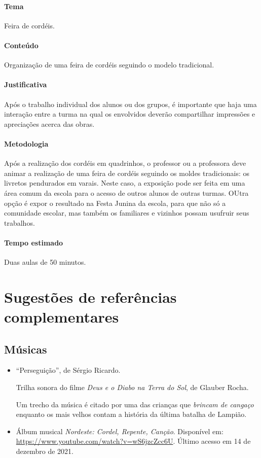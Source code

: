\documentclass[11pt]{extarticle}
\begin{document}

\paragraph{Tema} Feira de cordéis.

\paragraph{Conteúdo} Organização de uma feira de cordéis seguindo o modelo tradicional.

\paragraph{Justificativa} Após o trabalho individual dos alunos ou dos grupos,
é importante que haja uma interação entre a turma na qual os envolvidos
deverão compartilhar impressões e apreciações acerca das obras.

\paragraph{Metodologia} Após a realização dos cordéis em quadrinhos,
 o professor ou a professora deve animar a realização de uma feira de cordéis 
  seguindo os moldes tradicionais: os livretos pendurados em varais.
 Neste caso, a exposição pode ser feita em uma área comum da escola para o acesso de outros alunos
 de outras turmas. OUtra opção é expor o resultado na Festa Junina da escola, para que não só a comunidade
 escolar, mas também os familiares e vizinhos possam usufruir seus trabalhos.


\paragraph{Tempo estimado} Duas aulas de 50 minutos.
 


\section{Sugestões de referências complementares}

\subsection{Músicas} 

\begin{itemize}
	\item ``Perseguição'', de Sérgio Ricardo. 

Trilha sonora do filme \textit{Deus e o Diabo na Terra do Sol}, de Glauber Rocha. 

Um trecho da música é citado por uma das crianças que \textit{brincam de cangaço} enquanto os mais velhos contam a história
da última batalha de Lampião.

	\item Álbum musical \textit{Nordeste: Cordel, Repente, Canção}. Disponível em: \url{https://www.youtube.com/watch?v=wS6jzcZcc6U}. Último acesso em 14 de dezembro de 2021.
\end{itemize}
\end{document}
